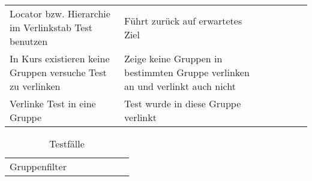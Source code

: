 \begin{table}[]
\begin{tabular}{p{6cm}p{7cm}p{3cm}llll}
		Locator bzw. Hierarchie im Verlinkstab Test benutzen                                                                                 & Führt zurück auf erwartetes Ziel                                                                                                                                 & \checkmark           &  &  &  \\
		In Kurs existieren keine Gruppen versuche Test zu verlinken                                                                          & Zeige keine Gruppen in bestimmten Gruppe verlinken an und verlinkt auch nicht                                                                                    & \checkmark           &  &  &  \\
		Verlinke Test in eine Gruppe                                                                                                         & Test wurde in diese Gruppe verlinkt                                                                                                                              & \checkmark           &  &  &  \\
	
	\end{tabular}
\end{table}


\begin{table}[]
	\centering
	\caption{Testfälle}
	\label{my-label}
	\begin{tabular}{p{6cm}p{7cm}p{3cm}llll}
		Gruppenfilter                                                                                                                      &                                                                                                                                                                  &             &  &  &  \\

	\end{tabular}
\end{table}

